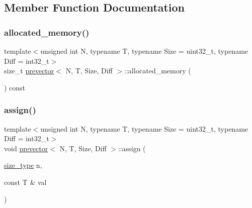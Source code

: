 \subsection{Member Function Documentation}
\mbox{\label{classprevector_ad4828b9a087bccd2f7f45dbbcf7cafe7}} 
\subsubsection{\texorpdfstring{allocated\+\_\+memory()}{allocated\_memory()}}
{\footnotesize\ttfamily template$<$unsigned int N, typename T, typename Size = uint32\+\_\+t, typename Diff = int32\+\_\+t$>$ \\
size\+\_\+t \mbox{\hyperlink{classprevector}{prevector}}$<$ N, T, Size, Diff $>$\+::allocated\+\_\+memory (\begin{DoxyParamCaption}{ }\end{DoxyParamCaption}) const\hspace{0.3cm}{\ttfamily [inline]}}

\mbox{\label{classprevector_aecbf4de43de23c1b01a2e39bf974f14e}} 
\subsubsection{\texorpdfstring{assign()}{assign()}\hspace{0.1cm}{\footnotesize\ttfamily [1/2]}}
{\footnotesize\ttfamily template$<$unsigned int N, typename T, typename Size = uint32\+\_\+t, typename Diff = int32\+\_\+t$>$ \\
void \mbox{\hyperlink{classprevector}{prevector}}$<$ N, T, Size, Diff $>$\+::assign (\begin{DoxyParamCaption}\item[{\mbox{\hyperlink{classprevector_a7e0da95e6d1c878f6eeb572f4fc12524}{size\+\_\+type}}}]{n,  }\item[{const T \&}]{val }\end{DoxyParamCaption})\hspace{0.3cm}{\ttfamily [inline]}}

\mbox{\label{classprevector_a8bb8dd8d722522a475b6a36bc93cd8c1}} 

